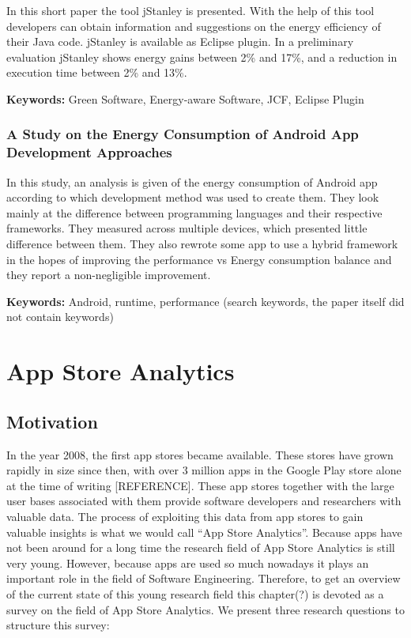 \documentclass[]{book}
\begin{document}
In this short paper the tool jStanley is presented. With the help of
this tool developers can obtain information and suggestions on the
energy efficiency of their Java code. jStanley is available as Eclipse
plugin. In a preliminary evaluation jStanley shows energy gains between
2\% and 17\%, and a reduction in execution time between 2\% and 13\%.

\textbf{Keywords:} Green Software, Energy-aware Software, JCF, Eclipse
Plugin

\subsection{A Study on the Energy Consumption of Android App Development
Approaches}\label{a-study-on-the-energy-consumption-of-android-app-development-approaches}

In this study, an analysis is given of the energy consumption of Android
app according to which development method was used to create them. They
look mainly at the difference between programming languages and their
respective frameworks. They measured across multiple devices, which
presented little difference between them. They also rewrote some app to
use a hybrid framework in the hopes of improving the performance vs
Energy consumption balance and they report a non-negligible improvement.

\textbf{Keywords:} Android, runtime, performance (search keywords, the
paper itself did not contain keywords)

\chapter{App Store Analytics}\label{app-store-analytics}

\section{Motivation}\label{motivation-5}

In the year 2008, the first app stores became available. These stores
have grown rapidly in size since then, with over 3 million apps in the
Google Play store alone at the time of writing {[}REFERENCE{]}. These
app stores together with the large user bases associated with them
provide software developers and researchers with valuable data. The
process of exploiting this data from app stores to gain valuable
insights is what we would call ``App Store Analytics''. Because apps
have not been around for a long time the research field of App Store
Analytics is still very young. However, because apps are used so much
nowadays it plays an important role in the field of Software
Engineering. Therefore, to get an overview of the current state of this
young research field this chapter(?) is devoted as a survey on the field
of App Store Analytics. We present three research questions to structure
this survey:
\end{document}
